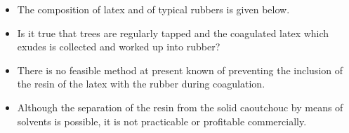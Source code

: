 \begin{frame}{\titleprefix}

\begin{itemize}
	\item The composition of latex and of typical rubbers is given below.
	\item Is it true that trees are regularly tapped and the coagulated latex which exudes is collected and worked up into rubber?
\end{itemize}

\pause

\begin{itemize}
	\item There is no feasible method at present known of preventing the inclusion of the resin of the latex with the rubber during coagulation.
	\item[$\Rightarrow$\hspace{-2.5pt}] Although the separation of the resin from the solid caoutchouc by means of solvents is possible, it is not practicable or profitable commercially.
\end{itemize}

\end{frame}


